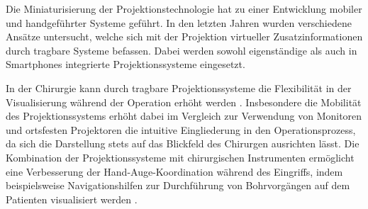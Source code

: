 

\prever{
}

\prever{
}

Die Miniaturisierung der Projektionstechnologie hat zu einer Entwicklung mobiler und handgeführter Systeme geführt. In den letzten Jahren wurden verschiedene Ansätze untersucht, welche sich mit der Projektion virtueller Zusatzinformationen durch tragbare Systeme befassen. Dabei werden sowohl eigenständige als auch in Smartphones integrierte Projektionssysteme eingesetzt.\\

\prever{
}

In der Chirurgie kann durch tragbare Projektionssysteme die Flexibilität in der Visualisierung während der Operation erhöht werden \cite{Kobler2010} \cite{Gavaghan2012}. Insbesondere die Mobilität des Projektionssystems erhöht dabei im Vergleich zur Verwendung von Monitoren und ortsfesten Projektoren die intuitive Eingliederung in den Operationsprozess, da sich die Darstellung stets auf das Blickfeld des Chirurgen ausrichten lässt. Die Kombination der Projektionssysteme mit chirurgischen Instrumenten ermöglicht eine Verbesserung der Hand-Auge-Koordination während des Eingriffs, indem beispielsweise Navigationshilfen zur Durchführung von Bohrvorgängen auf dem Patienten visualisiert werden \cite{Kobler2012}.\\

